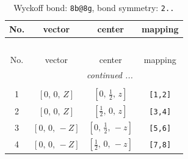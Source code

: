 \documentclass[fleqn,8pt]{jsarticle}
\begin{document}
\renewcommand{\arraystretch}{1.2}
\begin{longtable}{cccc}
\caption{Wyckoff bond: {\tt 8b@8g}, bond symmetry: {\tt 2..}}
 \\
 \hline \hline
No. & vector & center & mapping \\ \hline \endfirsthead

\multicolumn{3}{l}{\tablename\ \thetable{}} \\
 \hline \hline
No. & vector & center & mapping \\ \hline \endhead

 \hline \hline
\multicolumn{3}{r}{\footnotesize\it continued ...} \\ \endfoot

 \hline \hline
\multicolumn{3}{r}{} \\ \endlastfoot

1 & $\left[ 0,\, 0,\, Z \right]$ & $\left[ 0,\, \frac{1}{2},\, z \right]$ & {\tt [1,2]} \\ \hline
2 & $\left[ 0,\, 0,\, Z \right]$ & $\left[ \frac{1}{2},\, 0,\, z \right]$ & {\tt [3,4]} \\ \hline
3 & $\left[ 0,\, 0,\, - Z \right]$ & $\left[ 0,\, \frac{1}{2},\, - z \right]$ & {\tt [5,6]} \\ \hline
4 & $\left[ 0,\, 0,\, - Z \right]$ & $\left[ \frac{1}{2},\, 0,\, - z \right]$ & {\tt [7,8]} \\
\end{longtable}
\renewcommand{\arraystretch}{1.2}
\end{document}
